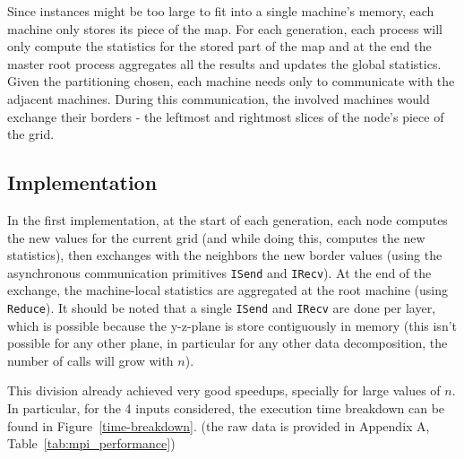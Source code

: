 \documentclass{article}
\begin{document}
Since instances might be too large to fit into a single machine's memory, each
machine only stores its piece of the map. For each generation, each process will
only compute the statistics for the stored part of the map and at the end the master
root process aggregates all the results and updates the global statistics.
Given the partitioning chosen, each machine needs only to 
communicate with the adjacent machines. During this 
communication, the involved machines would exchange their borders - the leftmost
and rightmost slices of the node's piece of the grid.



\subsection{Implementation}

In the first implementation, at the start of each generation, each node computes
the new values for the current grid (and while doing this, computes the new
statistics), then exchanges with the neighbors the new border values (using the asynchronous
communication primitives \texttt{ISend} and \texttt{IRecv}). At the end of the
exchange, the machine-local statistics are aggregated at the root machine (using \texttt{Reduce}).
It should be noted that a single \texttt{ISend} and \texttt{IRecv} are done per layer,
which is possible because the y-z-plane is store contiguously in memory (this isn't possible
for any other plane, in particular for any other data decomposition, the number of calls will
grow with $n$).

This division already achieved very good speedups, specially for large values of 
$n$. In particular, for the 4 inputs considered, the execution time breakdown can
be found in Figure~\ref{time-breakdown}.
(the raw data is provided in Appendix A, Table~\ref{tab:mpi_performance})
\end{document}

